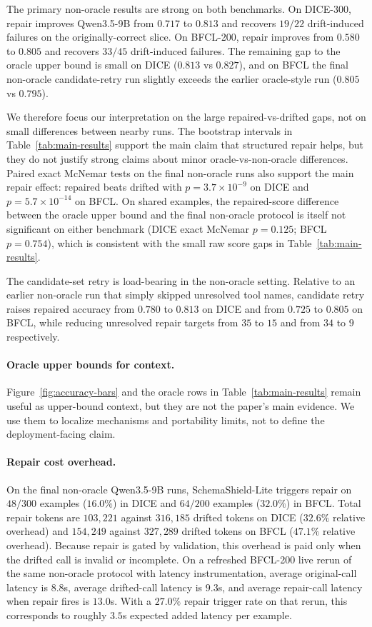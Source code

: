 \documentclass{svproc}
\newcommand{\method}{SchemaShield-Lite\xspace}
\begin{document}
The primary non-oracle results are strong on both benchmarks. On DICE-300, repair
improves Qwen3.5-9B from $0.717$ to $0.813$ and recovers $19/22$ drift-induced
failures on the originally-correct slice. On BFCL-200, repair improves from $0.580$
to $0.805$ and recovers $33/45$ drift-induced failures. The remaining gap to the
oracle upper bound is small on DICE ($0.813$ vs $0.827$), and on BFCL the final
non-oracle candidate-retry run slightly exceeds the earlier oracle-style run
($0.805$ vs $0.795$).

We therefore focus our interpretation on the large repaired-vs-drifted gaps, not on
small differences between nearby runs. The bootstrap intervals in
Table~\ref{tab:main-results} support the main claim that structured repair helps,
but they do not justify strong claims about minor oracle-vs-non-oracle differences.
Paired exact McNemar tests on the final non-oracle runs also support the main
repair effect: repaired beats drifted with $p=3.7\times 10^{-9}$ on DICE and
$p=5.7\times 10^{-14}$ on BFCL. On shared examples, the repaired-score difference
between the oracle upper bound and the final non-oracle protocol is itself not
significant on either benchmark (DICE exact McNemar $p=0.125$; BFCL
$p=0.754$), which is consistent with the small raw score gaps in
Table~\ref{tab:main-results}.

The candidate-set retry is load-bearing in the non-oracle setting. Relative to an
earlier non-oracle run that simply skipped unresolved tool names, candidate retry
raises repaired accuracy from $0.780$ to $0.813$ on DICE and from $0.725$ to
$0.805$ on BFCL, while reducing unresolved repair targets from $35$ to $15$ and
from $34$ to $9$ respectively.

\paragraph{Oracle upper bounds for context.}
Figure~\ref{fig:accuracy-bars} and the oracle rows in
Table~\ref{tab:main-results} remain useful as upper-bound context, but they are not
the paper's main evidence. We use them to localize mechanisms and portability
limits, not to define the deployment-facing claim.

\paragraph{Repair cost overhead.}
On the final non-oracle Qwen3.5-9B runs, \method triggers repair on $48/300$
examples ($16.0\%$) in DICE and $64/200$ examples ($32.0\%$) in BFCL. Total repair
tokens are $103{,}221$ against $316{,}185$ drifted tokens on DICE ($32.6\%$
relative overhead) and $154{,}249$ against $327{,}289$ drifted tokens on BFCL
($47.1\%$ relative overhead). Because repair is gated by validation, this overhead
is paid only when the drifted call is invalid or incomplete. On a refreshed
BFCL-200 live rerun of the same non-oracle protocol with latency instrumentation,
average original-call latency is $8.8$s, average drifted-call latency is $9.3$s,
and average repair-call latency when repair fires is $13.0$s. With a $27.0\%$
repair trigger rate on that rerun, this corresponds to roughly $3.5$s expected
added latency per example.
\end{document}

